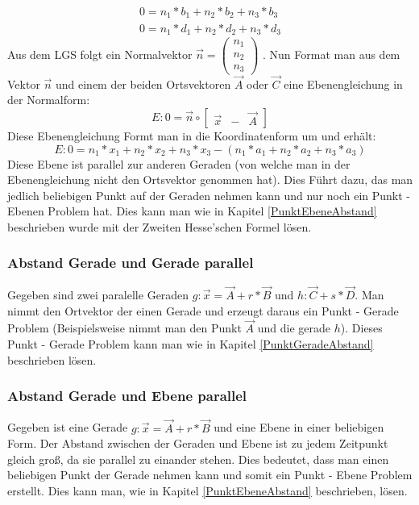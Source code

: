 \documentclass{article}
\begin{document}
\begin{equation}
\begin{matrix}
0 = n_1 * b_1 + n_2 * b_2 + n_3 * b_3 \\
0 = n_1 * d_1 + n_2 * d_2 + n_3 * d_3
\end{matrix}
\end{equation}
Aus dem LGS folgt ein Normalvektor $\vec{n} = \begin{pmatrix} n_1 \\ n_2 \\ n_3 \end{pmatrix}$ . Nun Format man aus dem Vektor $\vec{n}$ und einem der beiden Ortsvektoren $\vec{A}$ oder $\vec{C}$ eine Ebenengleichung in der Normalform:
\begin{equation}
E : 0 = \vec{n} \circ \begin{bmatrix} \vec{x} & - & \vec{A} \end{bmatrix}
\end{equation}
Diese Ebenengleichung Formt man in die Koordinatenform um und erhält:
\begin{equation}
E : 0 = n_1 * x_1 + n_2 * x_2 + n_3 * x_3 - (n_1 * a_1 + n_2 * a_2 + n_3 * a_3)
\end{equation}
Diese Ebene ist parallel zur anderen Geraden (von welche man in der Ebenengleichung nicht den Ortsvektor genommen hat). Dies Führt dazu, das man jedlich beliebigen Punkt auf der Geraden nehmen kann und nur noch ein Punkt - Ebenen Problem hat. Dies kann man wie in Kapitel \ref{PunktEbeneAbstand} beschrieben wurde mit der Zweiten Hesse'schen Formel lösen.

\subsubsection{Abstand Gerade und Gerade parallel}
Gegeben sind zwei paralelle Geraden $g : \vec{x} = \vec{A} + r * \vec{B}$ und $h : \vec{C} + s * \vec{D}$. Man nimmt den Ortvektor der einen Gerade und erzeugt daraus ein Punkt - Gerade Problem (Beispielsweise nimmt man den Punkt $\vec{A}$ und die gerade $h$). Dieses Punkt - Gerade Problem kann man wie in Kapitel \ref{PunktGeradeAbstand} beschrieben lösen.

\subsubsection{Abstand Gerade und Ebene parallel}
Gegeben ist eine Gerade $g : \vec{x} = \vec{A} + r * \vec{B}$ und eine Ebene in einer beliebigen Form. Der Abstand zwischen der Geraden und Ebene ist zu jedem Zeitpunkt gleich groß, da sie parallel zu einander stehen. Dies bedeutet, dass man einen beliebigen Punkt der Gerade nehmen kann und somit ein Punkt - Ebene Problem erstellt. Dies kann man, wie in Kapitel \ref{PunktEbeneAbstand} beschrieben, lösen.
\end{document}
